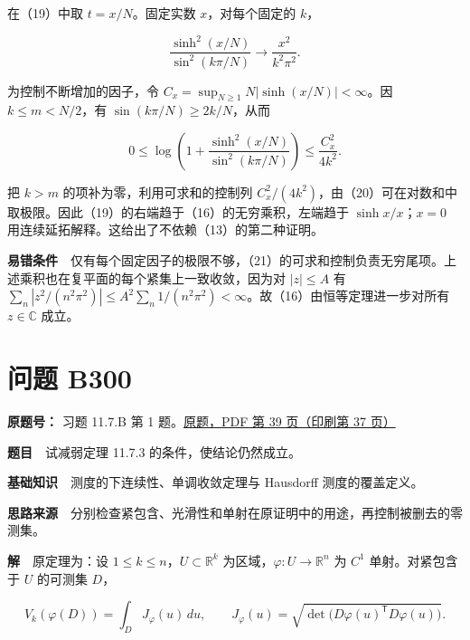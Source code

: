 \documentclass[11pt,a4paper]{article}
\begin{document}
在（19）中取 \(t=x/N\)。固定实数 \(x\)，对每个固定的 \(k\)，

\begin{equation}
\frac{\sinh^2(x/N)}{\sin^2(k\pi/N)}
\longrightarrow\frac{x^2}{k^2\pi^2}.
\tag{20}
\end{equation}

为控制不断增加的因子，令 \(C_x=\sup_{N\ge1}N|\sinh(x/N)|<\infty\)。因
\(k\le m<N/2\)，有 \(\sin(k\pi/N)\ge2k/N\)，从而

\begin{equation}
0\le\log\left(1+\frac{\sinh^2(x/N)}{\sin^2(k\pi/N)}\right)
\le\frac{C_x^2}{4k^2}.
\tag{21}
\end{equation}

把 \(k>m\) 的项补为零，利用可求和的控制列
\(C_x^2/(4k^2)\)，由（20）可在对数和中取极限。因此（19）的右端趋于（16）的无穷乘积，左端趋于
\(\sinh x/x\)；\(x=0\)
用连续延拓解释。这给出了不依赖（13）的第二种证明。

\textbf{易错条件}　仅有每个固定因子的极限不够，（21）的可求和控制负责无穷尾项。上述乘积也在复平面的每个紧集上一致收敛，因为对
\(|z|\le A\) 有
\(\sum_n|z^2/(n^2\pi^2)|\le A^2\sum_n1/(n^2\pi^2)<\infty\)。故（16）由恒等定理进一步对所有
\(z\in\mathbb C\) 成立。

\section{问题 B300}\label{ux95eeux9898-b300}

\textbf{原题号：} 习题 11.7.B 第 1
题。\href{https://zj139.github.io/math-notes/files/problems/楼分析习题-v2.pdf\#page=39}{原题，PDF
第 39 页（印刷第 37 页）}

\textbf{题目}　试减弱定理 11.7.3 的条件，使结论仍然成立。

\textbf{基础知识}　测度的下连续性、单调收敛定理与 Hausdorff
测度的覆盖定义。

\textbf{思路来源}　分别检查紧包含、光滑性和单射在原证明中的用途，再控制被删去的零测集。

\textbf{解}　原定理为：设 \(1\le k\le n\)，\(U\subset\mathbb R^k\)
为区域，\(\varphi:U\to\mathbb R^n\) 为 \(C^1\) 单射。对紧包含于 \(U\)
的可测集 \(D\)，

\begin{equation}
V_k(\varphi(D))=\int_DJ_\varphi(u)\,du,\qquad
J_\varphi(u)=\sqrt{\det\bigl(D\varphi(u)^{\mathsf T}D\varphi(u)\bigr)}.
\tag{22}
\end{equation}
\end{document}
